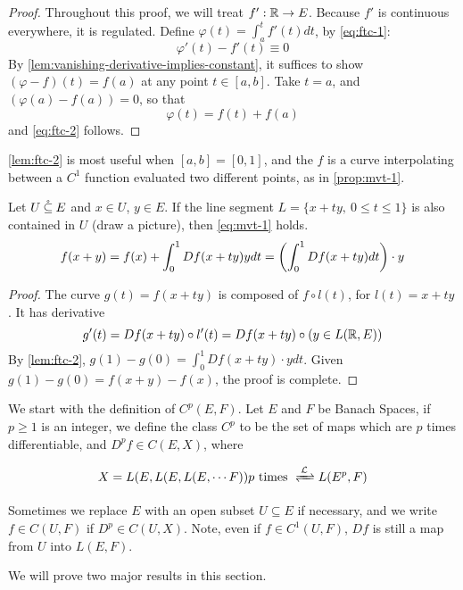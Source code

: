 \documentclass[../main-v2-manifolds.tex]{subfiles}
\begin{document}
\begin{proof}
    Throughout this proof, we will treat $f': \mathbb{R}\to E$. Because $f'$ is continuous everywhere, it is regulated. Define $\varphi(t) = \int_a^t f'(t)dt$, by \cref{eq:ftc-1}:
    \[
        \varphi'(t) - f'(t)\equiv 0
    \]
    By \cref{lem:vanishing-derivative-implies-constant}, it suffices to show $(\varphi - f)(t) = f(a)$ at any point $t\in [a,b]$. Take $t = a$, and $(\varphi(a) - f(a)) = 0$, so that 
    \[
    \varphi(t) = f(t) + f(a)
    \]
    and \cref{eq:ftc-2} follows.
\end{proof}
\begin{remark}
    \cref{lem:ftc-2} is most useful when $[a,b] = [0,1]$, and the $f$ is a curve interpolating between a $C^1$ function evaluated two different points, as in \cref{prop:mvt-1}.
\end{remark}
%
\begin{wts}[MVT 1]\label{prop:mvt-1}
    Let $U\:\mathring{\subseteq}\: E$ and $x\in U$, $y\in E$. If the line segment $L = \{x + ty,\: 0\leq t\leq 1\}$ is also contained in $U$ (draw a picture), then \cref{eq:mvt-1} holds.
    \begin{equation}\label{eq:mvt-1}
        f(x+y) = f(x) + \int_0^1 Df(x+ty)ydt = \qty(\int_0^1 Df(x+ty)dt)\cdot y
    \end{equation}
\end{wts}
\begin{proof}
    The curve $g(t) = f(x+ty)$ is composed of $f\circ l(t)$, for $l(t) = x+ty$. It has derivative
    \[
        g'(t) = Df(x+ty)\circ l'(t) = Df(x+ty)\circ (y\in L(\mathbb{R},E))
    \]
    By \cref{lem:ftc-2}, $g(1)- g(0) =\int_0^1 Df(x+ty)\cdot y dt$. Given $g(1)-g(0) = f(x+y) - f(x)$, the proof is complete.
\end{proof}

\newpage
{}
We start with the definition of $C^p(E,F)$. Let $E$ and $F$ be Banach Spaces, if $p\geq 1$ is an integer, we define the class $C^p$ to be the set of maps which are $p$ times differentiable, and $D^p f\in C(E, X)$, where 

\[
    X = L(E, L(E, L(E,\cdots F))  p\text{ times }  \Isomor{L} L(E^p, F)
\]

Sometimes we replace $E$ with an open subset $U\subseteq E$ if necessary, and we write $f\in C(U,F)$ if $D^p\in C(U,X)$. Note, even if $f\in C^1(U,F)$, $Df$ is still a map from $U$ into $L(E,F)$. 

We will prove two major results in this section.
\end{document}
